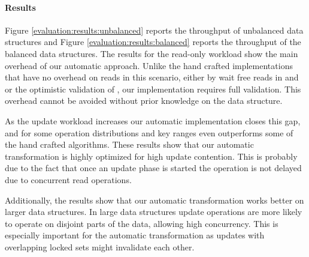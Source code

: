 \paragraph{Results} Figure \ref{evaluation:results:unbalanced} 
reports the throughput of unbalanced data structures and Figure 
\ref{evaluation:results:balanced} reports
the throughput of the balanced data structures. 
The results for the read-only workload show the main overhead
of our automatic approach. Unlike the hand crafted implementations
that have no overhead on reads in this scenario, either by wait free reads in
\danaTree and \danaAVL or the optimistic validation of \bronson, 
our implementation requires full \readSet validation.
This overhead cannot be avoided without prior knowledge on the
data structure.
 
As the update workload increases our automatic implementation 
closes this gap, and for some operation distributions and 
key ranges even outperforms some of the hand crafted algorithms.
These results show that our automatic transformation is highly optimized for
high update contention. This is probably due to the fact that once
an update phase is started the operation is not delayed due to concurrent 
read operations. 

Additionally, the results show that our automatic transformation 
works better on larger data structures. In large data structures 
update operations are more likely to operate on disjoint parts of 
the data, allowing high concurrency. This is especially important 
for the automatic transformation as updates  with overlapping 
locked sets might invalidate each other.  
 


\begin{figure*}
\begin{center}

\end{center}
\caption{Throughput of unbalanced data
structures.
\label{evaluation:results:unbalanced}}
\end{figure*}


\begin{figure*}
\begin{center}



\end{center}
\caption{Throughput of balanced data
structures.
\label{evaluation:results:balanced}}
\end{figure*}